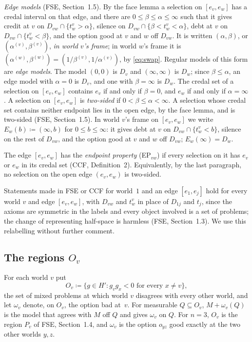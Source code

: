 \documentclass[11pt]{article}
\theoremstyle{definition}\newtheorem{definition}[theorem]{Definition}
\theoremstyle{remark}\newtheorem{remark}[theorem]{Remark}
\begin{document}
\emph{Edge models} (FSE, Section~1.5). By the face lemma a selection on
$[e_v,e_w]$ has a credal interval on that edge, and there are
$0\le\beta\le\alpha\le\infty$ such that it gives credit at $v$ on
$D_{vw}\cap\{t^v_w>\alpha\}$, silence on $D_{vw}\cap\{\beta<t^v_w<\alpha\}$,
debt at $v$ on $D_{vw}\cap\{t^v_w<\beta\}$, and the option good at $v$ and
$w$ off $D_{vw}$. It is written $(\alpha,\beta)$, or
$(\alpha^{(v)},\beta^{(v)})$, \emph{in world $v$'s frame}; in world $w$'s
frame it is $(\alpha^{(w)},\beta^{(w)})=(1/\beta^{(v)},1/\alpha^{(v)})$, by
\eqref{eq:swap}. Regular models of this form are \emph{edge models}. The
model $(0,0)$ is $D_v$ and $(\infty,\infty)$ is $D_w$; since
$\beta\le\alpha$, an edge model with $\alpha=0$ is $D_v$, and one with
$\beta=\infty$ is $D_w$. The credal set of a selection on $[e_v,e_w]$
contains $e_v$ if and only if $\beta=0$, and $e_w$ if and only if
$\alpha=\infty$. A selection on $[e_v,e_w]$ is \emph{two-sided} if
$0<\beta\le\alpha<\infty$. A selection whose credal set contains neither
endpoint lies in the open edge, by the face lemma, and is two-sided (FSE,
Section~1.5). In world $v$'s frame on $[e_v,e_w]$ we write
$E_w(b)\coloneqq(\infty,b)$ for $0\le b\le\infty$: it gives debt at $v$ on
$D_{vw}\cap\{t^v_w<b\}$, silence on the rest of $D_{vw}$, and the option
good at $v$ and $w$ off $D_{vw}$; $E_w(\infty)=D_w$.

The edge $[e_v,e_w]$ has the \emph{endpoint property} (EP$_{vw}$) if every
selection on it has $e_v$ or $e_w$ in its credal set (CCF, Definition~2).
Equivalently, by the last paragraph, no selection on the open edge
$(e_v,e_w)$ is two-sided.

Statements made in FSE or CCF for world~$1$ and an edge $[e_1,e_j]$ hold
for every world $v$ and edge $[e_v,e_w]$, with $D_{vw}$ and $t^v_w$ in
place of $D_{1j}$ and $t_j$, since the axioms are symmetric in the labels
and every object involved is a set of problems; the change of representing
half-space is harmless (FSE, Section~1.3). We use this relabelling without
further comment.

\subsection{The regions \texorpdfstring{$O_v$}{O\_v}}\label{sec:regions}

For each world $v$ put
\[
 O_v\coloneqq\{g\in H':g_vg_x<0\text{ for every }x\ne v\},
\]
the set of mixed problems at which world $v$ disagrees with every other
world, and let $\omega_v$ denote, on $O_v$, the option bad at~$v$. For
measurable $Q\subseteq O_v$, $M+\omega_v(Q)$ is the model that agrees with
$M$ off $Q$ and gives $\omega_v$ on $Q$. For $n=3$, $O_v$ is the region
$P_v$ of FSE, Section~1.4, and $\omega_v$ is the option $o_{yz}$ good
exactly at the two other worlds $y,z$.
\end{document}
